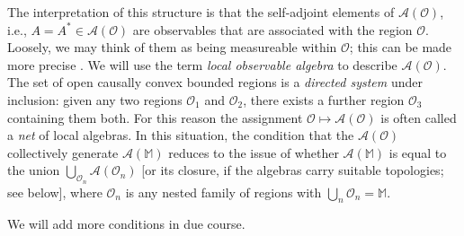 \documentclass[12pt]{article}
\newcommand{\1}{\mathds{1}}                         %
\newcommand{\Ocal}{\mathcal{O}}
\newcommand{\MM}{\mathbb{M}}
\newcommand{\Ac}{{\mathcal{A}}}
\begin{document}
	The interpretation of this structure is that the self-adjoint elements of $\Ac(\Ocal)$,
	i.e., $A=A^*\in\Ac(\Ocal)$ are observables that are associated with the region $\Ocal$.
	Loosely, we may think of them as being measureable within $\Ocal$; this can be made more precise \cite{FV:2018}. We will use the term \emph{local observable algebra} to describe $\Ac(\Ocal)$.
	The set of open causally convex bounded regions is a \emph{directed system} under inclusion: given any two regions $\Ocal_1$ and $\Ocal_2$, there exists a further region $\Ocal_3$ containing them both. For this reason the assignment $\Ocal\mapsto\Ac(\Ocal)$ is often called a \emph{net} of local algebras. In this situation, the condition that the $\Ac(\Ocal)$ collectively generate $\Ac(\MM)$ reduces to the issue of whether $\Ac(\MM)$ is equal to the union $\bigcup_{\Ocal_n}\Ac(\Ocal_n)$ [or its closure, if the algebras carry suitable topologies; see below], where $\Ocal_n$ is any nested family of regions with $\bigcup_n \Ocal_n=\MM$.
	
	We will add more conditions in due course.
\end{document}
